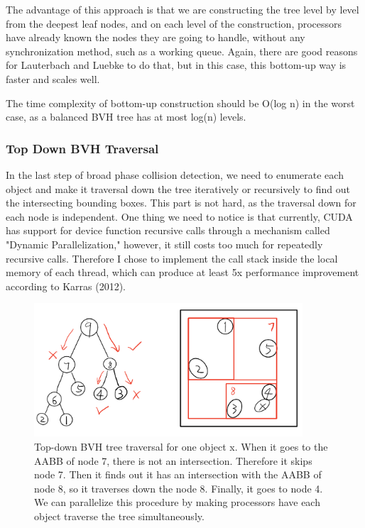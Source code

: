 \documentclass[11pt]{article}
\begin{document}
The advantage of this approach is that we are constructing the tree level by level from the deepest leaf nodes, and on each level of the construction, processors have already known the nodes they are going to handle, without any synchronization method, such as a working queue. Again, there are good reasons for Lauterbach and Luebke to do that, but in this case, this bottom-up way is faster and scales well.

The time complexity of bottom-up construction should be O(log n) in the worst case, as a balanced BVH tree has at most log(n) levels.

\subsubsection{Top Down BVH Traversal}
\label{sec:org7859882}
In the last step of broad phase collision detection, we need to enumerate each object and make it traversal down the tree iteratively or recursively to find out the intersecting bounding boxes. This part is not hard, as the traversal down for each node is independent. One thing we need to notice is that currently, CUDA has support for device function recursive calls through a mechanism called "Dynamic Parallelization," however, it still costs too much for repeatedly recursive calls. Therefore I chose to implement the call stack inside the local memory of each thread, which can produce at least 5x performance improvement according to Karras (2012).

\begin{figure}[htbp]
\centering
\includegraphics[width=10cm]{./rep_8.png}
\caption{Top-down BVH tree traversal for one object x. When it goes to the AABB of node 7, there is not an intersection. Therefore it skips node 7. Then it finds out it has an intersection with the AABB of node 8, so it traverses down the node 8. Finally, it goes to node 4. We can parallelize this procedure by making processors have each object traverse the tree simultaneously.}
\end{figure}
\end{document}
